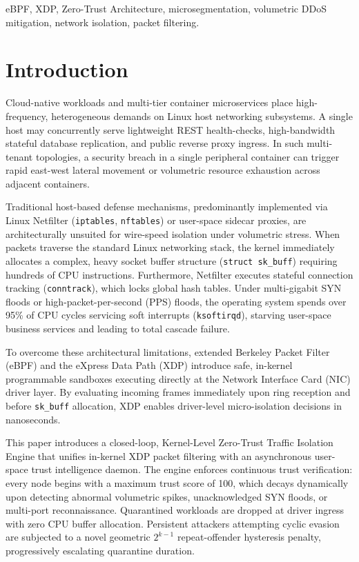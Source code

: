 \documentclass[conference]{IEEEtran}
\begin{document}
\begin{IEEEkeywords}
eBPF, XDP, Zero-Trust Architecture, microsegmentation, volumetric DDoS mitigation, network isolation, packet filtering.
\end{IEEEkeywords}

\section{Introduction}
Cloud-native workloads and multi-tier container microservices place high-frequency, heterogeneous demands on Linux host networking subsystems. A single host may concurrently serve lightweight REST health-checks, high-bandwidth stateful database replication, and public reverse proxy ingress. In such multi-tenant topologies, a security breach in a single peripheral container can trigger rapid east-west lateral movement or volumetric resource exhaustion across adjacent containers.

Traditional host-based defense mechanisms, predominantly implemented via Linux Netfilter (\texttt{iptables}, \texttt{nftables}) or user-space sidecar proxies, are architecturally unsuited for wire-speed isolation under volumetric stress. When packets traverse the standard Linux networking stack, the kernel immediately allocates a complex, heavy socket buffer structure (\texttt{struct sk\_buff}) requiring hundreds of CPU instructions. Furthermore, Netfilter executes stateful connection tracking (\texttt{conntrack}), which locks global hash tables. Under multi-gigabit SYN floods or high-packet-per-second (PPS) floods, the operating system spends over 95\% of CPU cycles servicing soft interrupts (\texttt{ksoftirqd}), starving user-space business services and leading to total cascade failure.

To overcome these architectural limitations, extended Berkeley Packet Filter (eBPF) and the eXpress Data Path (XDP) introduce safe, in-kernel programmable sandboxes executing directly at the Network Interface Card (NIC) driver layer. By evaluating incoming frames immediately upon ring reception and before \texttt{sk\_buff} allocation, XDP enables driver-level micro-isolation decisions in nanoseconds. 

This paper introduces a closed-loop, Kernel-Level Zero-Trust Traffic Isolation Engine that unifies in-kernel XDP packet filtering with an asynchronous user-space trust intelligence daemon. The engine enforces continuous trust verification: every node begins with a maximum trust score of 100, which decays dynamically upon detecting abnormal volumetric spikes, unacknowledged SYN floods, or multi-port reconnaissance. Quarantined workloads are dropped at driver ingress with zero CPU buffer allocation. Persistent attackers attempting cyclic evasion are subjected to a novel geometric $2^{k-1}$ repeat-offender hysteresis penalty, progressively escalating quarantine duration.
\end{document}
